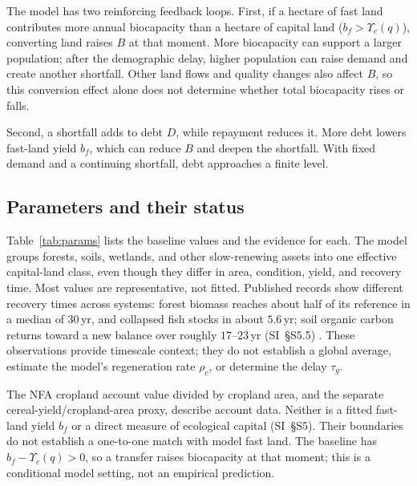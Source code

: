 \documentclass[preprint,12pt,authoryear]{elsarticle}
\newcommand{\Ups}{\Upsilon_c}
\begin{document}
The model has two reinforcing feedback loops. First, if a hectare of fast land contributes more annual biocapacity than a hectare of capital land ($b_f>\Ups(q)$), converting land raises $B$ at that moment. More biocapacity can support a larger population; after the demographic delay, higher population can raise demand and create another shortfall. Other land flows and quality changes also affect $B$, so this conversion effect alone does not determine whether total biocapacity rises or falls.

Second, a shortfall adds to debt $D$, while repayment reduces it. More debt lowers fast-land yield $b_f$, which can reduce $B$ and deepen the shortfall. With fixed demand and a continuing shortfall, debt approaches a finite level.

\subsection{Parameters and their status}\label{sec:params}

Table~\ref{tab:params} lists the baseline values and the evidence for each. The model groups forests, soils, wetlands, and other slow-renewing assets into one effective capital-land class, even though they differ in area, condition, yield, and recovery time. Most values are representative, not fitted. Published records show different recovery times across systems: forest biomass reaches about half of its reference in a median of $30$\,yr, and collapsed fish stocks in about $5.6$\,yr; soil organic carbon returns toward a new balance over roughly $17$--$23$\,yr (SI~\S S5.5) \citep{Poorter2016,HutchingsReynolds2004,Neubauer2013,Poeplau2011}. These observations provide timescale context; they do not establish a global average, estimate the model's regeneration rate $\rho_c$, or determine the delay $\tau_g$.

The NFA cropland account value divided by cropland area, and the separate cereal-yield/cropland-area proxy, describe account data. Neither is a fitted fast-land yield $b_f$ or a direct measure of ecological capital (SI~\S S5). Their boundaries do not establish a one-to-one match with model fast land. The baseline has $b_f-\Ups(q)>0$, so a transfer raises biocapacity at that moment; this is a conditional model setting, not an empirical prediction.
\end{document}
